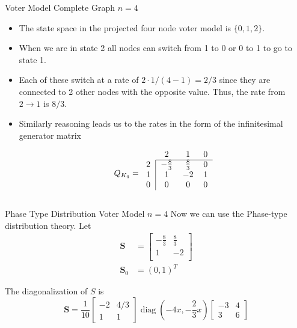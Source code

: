 \documentclass{beamer}
\theoremstyle{definition}
\begin{document}
\begin{frame}{Voter Model Complete Graph $n = 4$}
\begin{itemize}
    \item The state space in the projected four node voter model is $\{0,1,2\}$.
    \item When we are in state 2 all nodes can switch from 1 to 0 or 0 to 1 to go to state 1.
    \item Each of these switch at a rate of $2 \cdot 1/(4 - 1) = 2/3$ since they are connected to 2 other nodes with the opposite value. Thus, the rate from $2 \to 1$ is $8/3$.
    \item Similarly reasoning leads us to the rates in the form of the infinitesimal generator matrix

$$
Q_{K_4} = \begin{blockarray}{cccc}
    & 2 & 1 & 0\\
    \begin{block}{c|ccc}
        \cline{2-4}
        2 & -\frac{8}{3} & \frac{8}{3} & 0 \\
        1 & 1 & -2 & 1\\
        0 & 0 & 0 & 0\\
    \end{block}
\end{blockarray}
$$
\end{itemize}
\end{frame}

\begin{frame}{Phase Type Distribution Voter Model $n = 4$}
Now we can use the Phase-type distribution theory.
Let
    \begin{align*}
    \mathbf{S} &= \begin{bmatrix}
    -\frac{8}{3} & \frac{8}{3}\\
    1 & -2\\
    \end{bmatrix}\\
    \mathbf{S}_0 &= (0, 1)^T
\end{align*}

The diagonalization of $S$ is
$$
\mathbf{S} = \frac{1}{10} \begin{bmatrix}
    -2 & 4/3\\
    1 & 1
\end{bmatrix} \operatorname{diag}(-4x, - \frac{2}{3} x)
 \begin{bmatrix}
    -3 & 4\\
    3 & 6
\end{bmatrix}
$$
\end{frame}
\end{document}
